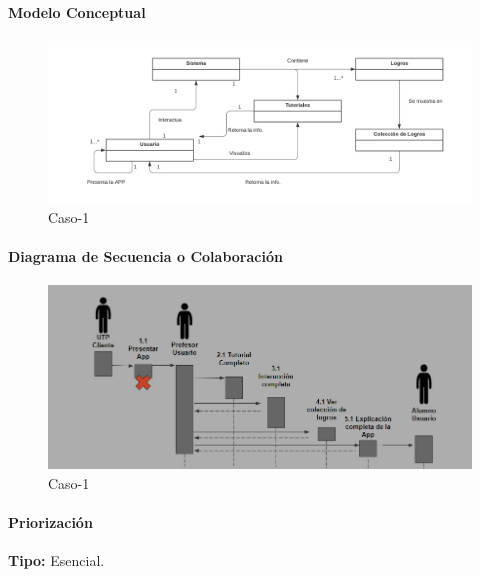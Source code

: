 \paragraph{Modelo Conceptual}

\begin{figure}[H]
\centerline{\includegraphics[width=15cm]{imgs/ModeloConceptualCaso_8_3.png}}
\caption{Caso-1}
\label{fig}
\end{figure}

\paragraph{Diagrama de Secuencia o Colaboración}

\begin{figure}[H]
\centerline{\includegraphics[width=15cm]{imgs/CasoUso_8_2.PNG}}
\caption{Caso-1}
\label{fig}
\end{figure}

\paragraph{Priorización}
{\textbf {Tipo:}}
Esencial.